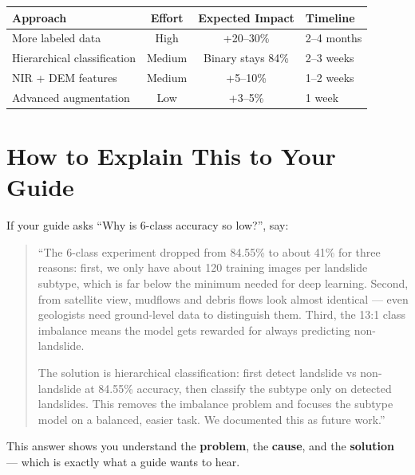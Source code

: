 \documentclass[12pt,a4paper]{article}
\begin{document}
\begin{table}[h]
    \centering
    \renewcommand{\arraystretch}{1.3}
    \begin{tabular}{lccl}
        \toprule
        \textbf{Approach} & \textbf{Effort} & \textbf{Expected Impact} & \textbf{Timeline} \\
        \midrule
        More labeled data & High & +20--30\% & 2--4 months \\
        Hierarchical classification & Medium & Binary stays 84\% & 2--3 weeks \\
        NIR + DEM features & Medium & +5--10\% & 1--2 weeks \\
        Advanced augmentation & Low & +3--5\% & 1 week \\
        \bottomrule
    \end{tabular}
\end{table}

\vspace{0.3cm}
\noindent{}

\section{How to Explain This to Your Guide}

If your guide asks ``Why is 6-class accuracy so low?'', say:

\begin{quote}
``The 6-class experiment dropped from 84.55\% to about 41\% for three reasons: first, we only have about 120 training images per landslide subtype, which is far below the minimum needed for deep learning. Second, from satellite view, mudflows and debris flows look almost identical --- even geologists need ground-level data to distinguish them. Third, the 13:1 class imbalance means the model gets rewarded for always predicting non-landslide.

The solution is hierarchical classification: first detect landslide vs non-landslide at 84.55\% accuracy, then classify the subtype only on detected landslides. This removes the imbalance problem and focuses the subtype model on a balanced, easier task. We documented this as future work.''
\end{quote}

This answer shows you understand the \textbf{problem}, the \textbf{cause}, and the \textbf{solution} --- which is exactly what a guide wants to hear.
\end{document}
